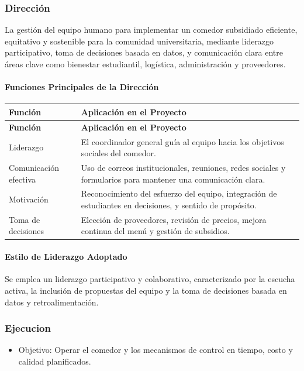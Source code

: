\documentclass[letterpaper, 11pt]{report}
\begin{document}
\subsubsection{Dirección}

La gestión del equipo humano para implementar un comedor subsidiado eficiente, equitativo y sostenible para la comunidad universitaria, mediante liderazgo participativo, toma de decisiones basada en datos, y comunicación clara entre áreas clave como bienestar estudiantil, logística, administración y proveedores.

\paragraph{Funciones Principales de la Dirección}
\begin{longtable}{|p{}|p{}|}
\hline
\textbf{Función} & \textbf{Aplicación en el Proyecto} \\
\hline
\endfirsthead

\hline
\textbf{Función} & \textbf{Aplicación en el Proyecto} \\
\hline
\endhead

\hline
\endfoot

\hline
\endlastfoot

Liderazgo & El coordinador general guía al equipo hacia los objetivos sociales del comedor. \\
\hline
Comunicación efectiva & Uso de correos institucionales, reuniones, redes sociales y formularios para mantener una comunicación clara. \\
\hline
Motivación & Reconocimiento del esfuerzo del equipo, integración de estudiantes en decisiones, y sentido de propósito. \\
\hline
Toma de decisiones & Elección de proveedores, revisión de precios, mejora continua del menú y gestión de subsidios. \\
\hline
\end{longtable}

\paragraph{Estilo de Liderazgo Adoptado}
Se emplea un liderazgo participativo y colaborativo, caracterizado por la escucha activa, la inclusión de propuestas del equipo y la toma de decisiones basada en datos y retroalimentación.

\subsubsection{Ejecucion}
\begin{itemize}
      \item Objetivo: Operar el comedor y los mecanismos de control en tiempo, costo y calidad planificados.
\end{itemize}
\end{document}
